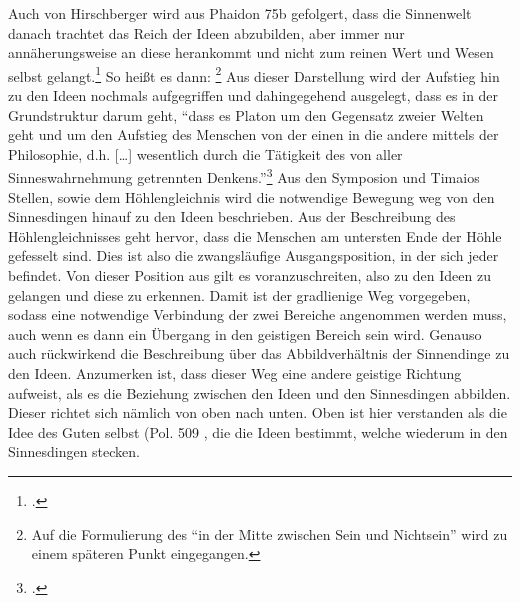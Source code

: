 Auch von Hirschberger wird aus Phaidon 75b gefolgert, dass die Sinnenwelt danach trachtet das Reich der Ideen abzubilden, aber immer nur annäherungsweise an diese herankommt und nicht zum reinen Wert und Wesen selbst gelangt.\footcite[vgl.][S. 100]{Hirschberger} So heißt es dann:
\footnote{Auf die Formulierung des \enquote{in der Mitte zwischen Sein und Nichtsein} wird zu einem späteren Punkt eingegangen.}
Aus dieser Darstellung wird der Aufstieg hin zu den Ideen nochmals aufgegriffen und dahingegehend ausgelegt, dass es in der Grundstruktur darum geht, \enquote{dass es Platon um den Gegensatz zweier Welten geht und um den Aufstieg des Menschen von der einen in die andere mittels der Philosophie, d.h. [\dots] wesentlich durch die Tätigkeit des von aller Sinneswahrnehmung getrennten Denkens.}\footcite[vgl.][S. 29]{DisseMetaphysik}
Aus den Symposion und Timaios Stellen, sowie dem Höhlengleichnis wird die notwendige Bewegung weg von den Sinnesdingen hinauf zu den Ideen beschrieben. Aus der Beschreibung des Höhlengleichnisses geht hervor, dass die Menschen am untersten Ende der Höhle gefesselt sind. Dies ist also die zwangsläufige Ausgangsposition, in der sich jeder befindet. Von dieser Position aus gilt es voranzuschreiten, also zu den Ideen zu gelangen und diese zu erkennen. Damit ist der gradlienige Weg vorgegeben, sodass eine notwendige Verbindung der zwei Bereiche angenommen werden muss, auch wenn es dann ein Übergang in den geistigen Bereich sein wird. Genauso auch rückwirkend die Beschreibung über das Abbildverhältnis der Sinnendinge zu den Ideen.
Anzumerken ist, dass dieser Weg eine andere geistige Richtung aufweist, als es die Beziehung zwischen den Ideen und den Sinnesdingen abbilden.
Dieser richtet sich nämlich von oben nach unten. Oben ist hier verstanden als die Idee des Guten selbst (Pol. 509 
, die die Ideen bestimmt, welche wiederum in den Sinnesdingen stecken.
